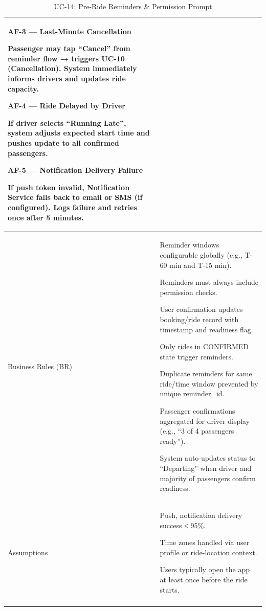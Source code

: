 \begin{longtable}{|p{3.5cm}|p{12cm}|}
\textbf{AF-3 --- Last-Minute Cancellation}

Passenger may tap “Cancel” from reminder flow → triggers UC-10 (Cancellation). System immediately informs drivers and updates ride capacity.

\textbf{AF-4 --- Ride Delayed by Driver}

If driver selects “Running Late”, system adjusts expected start time and pushes update to all confirmed passengers.

\textbf{AF-5 --- Notification Delivery Failure}

If push token invalid, Notification Service falls back to email or SMS (if configured). Logs failure and retries once after 5 minutes. \\
\hline
Business Rules (BR) &
Reminder windows configurable globally (e.g., T-60 min and T-15 min).

Reminders must always include permission checks.

User confirmation updates booking/ride record with timestamp and readiness flag.

Only rides in CONFIRMED state trigger reminders.

Duplicate reminders for same ride/time window prevented by unique reminder\_id.

Passenger confirmations aggregated for driver display (e.g., “3 of 4 passengers ready”).

System auto-updates status to “Departing” when driver and majority of passengers confirm readiness. \\
\hline
Assumptions &
Push, notification delivery success ≤ 95\%.

Time zones handled via user profile or ride-location context.

Users typically open the app at least once before the ride starts. \\
\hline
\caption{UC-14: Pre-Ride Reminders \& Permission Prompt}
\end{longtable}


